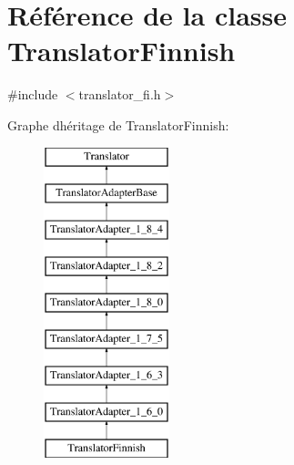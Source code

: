 \hypertarget{class_translator_finnish}{}\section{Référence de la classe Translator\+Finnish}
\label{class_translator_finnish}


{\ttfamily \#include $<$translator\+\_\+fi.\+h$>$}

Graphe d\textquotesingle{}héritage de Translator\+Finnish\+:\begin{figure}[H]
\begin{center}
\leavevmode
\includegraphics[height=9.000000cm]{class_translator_finnish}
\end{center}
\end{figure}
